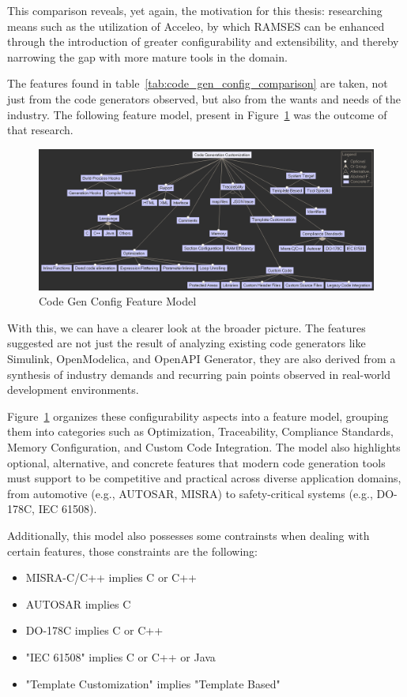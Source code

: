 This comparison reveals, yet again, the motivation for this thesis: researching means such as the utilization of Acceleo, by which RAMSES can be enhanced through the introduction of greater configurability and extensibility, and thereby narrowing the gap with more mature tools in the domain.

The features found in table~\ref{tab:code_gen_config_comparison} are taken, not just from the code generators observed, but also from the wants and needs of the industry. The following feature model, present in Figure~\ref{fig:feature_model} was the outcome of that research.

\begin{figure}[htbp]
	\centering
	\includegraphics[height=0.4\textwidth]{featureModel.png}
	\caption{Code Gen Config Feature Model}
	\label{fig:feature_model}
\end{figure}

With this, we can have a clearer look at the broader picture. The features suggested are not just the result of analyzing existing code generators like Simulink, OpenModelica, and OpenAPI Generator, they are also derived from a synthesis of industry demands and recurring pain points observed in real-world development environments.

Figure~\ref{fig:feature_model} organizes these configurability aspects into a feature model, grouping them into categories such as Optimization, Traceability, Compliance Standards, Memory Configuration, and Custom Code Integration. The model also highlights optional, alternative, and concrete features that modern code generation tools must support to be competitive and practical across diverse application domains, from automotive (e.g., \gls{AUTOSAR}, \gls{MISRA}) to safety-critical systems (e.g., DO-178C, \gls{IEC} 61508).

Additionally, this model also possesses some contrainsts when dealing with certain features, those constraints are the following:

\begin{itemize} 
	\item \gls{MISRA}-C/C++ implies C or C++
	\item \gls{AUTOSAR} implies C
	\item DO-178C implies C or C++
	\item "\gls{IEC} 61508" implies C or C++ or Java
	\item "Template Customization" implies "Template Based"
\end{itemize}

